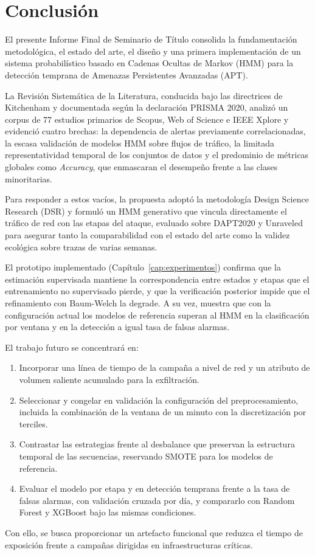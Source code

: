 \chapter{Conclusión}
El presente Informe Final de Seminario de Título consolida la fundamentación metodológica, el estado del arte, el diseño y una primera implementación de un sistema probabilístico basado en Cadenas Ocultas de Markov (HMM) para la detección temprana de Amenazas Persistentes Avanzadas (APT).

La Revisión Sistemática de la Literatura, conducida bajo las directrices de Kitchenham y documentada según la declaración PRISMA 2020, analizó un corpus de 77 estudios primarios de Scopus, Web of Science e IEEE Xplore y evidenció cuatro brechas: la dependencia de alertas previamente correlacionadas, la escasa validación de modelos HMM sobre flujos de tráfico, la limitada representatividad temporal de los conjuntos de datos y el predominio de métricas globales como \textit{Accuracy}, que enmascaran el desempeño frente a las clases minoritarias.

Para responder a estos vacíos, la propuesta adoptó la metodología Design Science Research (DSR) y formuló un HMM generativo que vincula directamente el tráfico de red con las etapas del ataque, evaluado sobre DAPT2020 y Unraveled para asegurar tanto la comparabilidad con el estado del arte como la validez ecológica sobre trazas de varias semanas.

El prototipo implementado (Capítulo~\ref{cap:experimentos}) confirma que la estimación supervisada mantiene la correspondencia entre estados y etapas que el entrenamiento no supervisado pierde, y que la verificación posterior impide que el refinamiento con Baum-Welch la degrade. A su vez, muestra que con la configuración actual los modelos de referencia superan al HMM en la clasificación por ventana y en la detección a igual tasa de falsas alarmas.

El trabajo futuro se concentrará en:
\begin{enumerate}
    \item Incorporar una línea de tiempo de la campaña a nivel de red y un atributo de volumen saliente acumulado para la exfiltración.
    \item Seleccionar y congelar en validación la configuración del preprocesamiento, incluida la combinación de la ventana de un minuto con la discretización por terciles.
    \item Contrastar las estrategias frente al desbalance que preservan la estructura temporal de las secuencias, reservando SMOTE para los modelos de referencia.
    \item Evaluar el modelo por etapa y en detección temprana frente a la tasa de falsas alarmas, con validación cruzada por día, y compararlo con Random Forest y XGBoost bajo las mismas condiciones.
\end{enumerate}

Con ello, se busca proporcionar un artefacto funcional que reduzca el tiempo de exposición frente a campañas dirigidas en infraestructuras críticas.
